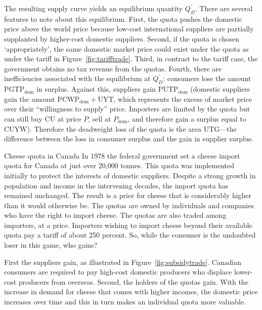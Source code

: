 

The resulting supply curve yields an equilibrium quantity $Q_D^{'}$. There are several features to note about this equilibrium. First, the quota pushes the domestic price above the world price because low-cost international suppliers are partially supplanted by higher-cost domestic suppliers. Second, if the quota is chosen `appropriately', the same domestic market price could exist under the quota as under the tariff in Figure~\ref{fig:tarifftrade}. Third, in contrast to the tariff case, the government obtains no tax revenue from the quotas. Fourth, there are inefficiencies associated with the equilibrium at $Q_D^{'}$: consumers lose the amount $\text{PGTP}_{\text{dom}}$ in surplus. Against this, suppliers gain $\text{PUTP}_{\text{dom}}$ (domestic suppliers gain the amount $\text{PCWP}_{\text{dom}}+\text{UYT}$, which represents the excess of market price over their ``willingness to supply'' price. Importers are limited by the quota but can still buy CU at price $P$, sell at $P_{\text{dom}}$, and therefore gain a surplus equal to CUYW). Therefore the deadweight loss of the quota is the area UTG---the difference between the loss in consumer surplus and the gain in supplier surplus.

\begin{ApplicationBox}{Cheese quota in Canada}\label{app:ch15app3}
In 1978 the federal government set a cheese import quota for Canada at just over 20,000 tonnes. This quota was implemented initially to protect the interests of domestic suppliers. Despite a strong growth in population and income in the intervening decades, the import quota has remained unchanged. The result is a price for cheese that is considerably higher than it would otherwise be. The quotas are owned by individuals and companies who have the right to import cheese. The quotas are also traded among importers, at a price. Importers wishing to import cheese beyond their available quota pay a tariff of about 250 percent. So, while the consumer is the undoubted loser in this game, who gains?

\bigskip
First the suppliers gain, as illustrated in Figure~\ref{fig:subsidytrade}. Canadian consumers are required to pay high-cost domestic producers who displace lower-cost producers from overseas. Second, the holders of the quotas gain. With the increase in demand for cheese that comes with higher incomes, the domestic price increases over time and this in turn makes an individual quota more valuable.
\end{ApplicationBox}